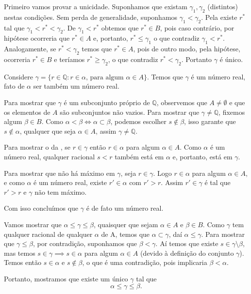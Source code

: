\documentclass[../main.tex]{subfiles}
\begin{document}
\begin{dem}
    Primeiro vamos provar a unicidade. Suponhamos que existam $\gamma_1, \gamma_2$ (distintos) nestas condições. Sem perda de generalidade, suponhamos $\gamma_1 < \gamma_2$.
    Pela  existe $r^*$ tal que $\gamma_1 < r^* < \gamma_2$. 
    De $\gamma_1 < r^*$ obtemos que $r^* \in B$, pois caso contrário, por hipótese ocorreria que $r^* \in A$ e, portanto, $r^* \leq \gamma_1$ o que contradiz $\gamma_1 < r^*$. Analogamente, se $r^* < \gamma_2$ temos que $r^* \in A$, pois de outro modo, pela hipótese, ocorreria $r^* \in B$ e teríamos $r^* \geq \gamma_2$, o que contradiz $ r^* < \gamma_2$. Portanto $\gamma$ é único.

    Considere $\gamma = \{ r \in \mathbb{Q} : r \in \alpha \text{, para algum } \alpha \in A \}$. Temos que $\gamma$ é um número real, fato de $\alpha$ ser também um número real.
    
    Para mostrar que $\gamma$ é um subconjunto próprio de $\mathbb{Q}$, observemos que $A \neq \emptyset$ e que os elementos de $A$ são subconjuntos não vazios. Para mostrar que $\gamma \neq \mathbb{Q}$, fixemos algum $\beta \in B$. Como $\alpha < \beta \iff \alpha \subset \beta$, podemos escolher $s \not\in \beta$, isso garante que $s \not\in \alpha$, qualquer que seja $\alpha \in A$, assim $\gamma \neq \mathbb{Q}$.

    Para mostrar o  da , se $r \in \gamma$ então $r \in \alpha$ para algum $\alpha \in A$. Como $\alpha$ é um número real, qualquer racional $s < r$ também está em $\alpha$ e, portanto, está em $\gamma$.

    Para mostrar que não há máximo em $\gamma$, seja $r \in \gamma$. Logo $r \in \alpha$ para algum $\alpha \in A$, e como $\alpha$ é um número real, existe $r' \in \alpha$ com $r'>r$. Assim $r' \in \gamma$ é tal que $r' > r$ e $\gamma$ não tem máximo. 

    Com isso concluímos que $\gamma$ é de fato um número real.

    Vamos mostrar que $\alpha \leq \gamma \leq \beta$, quaisquer que sejam $\alpha \in A$ e $\beta \in B$.
    Como $\gamma$ tem qualquer racional de qualquer $\alpha$ de A, temos que $\alpha \subset \gamma$, daí $\alpha \leq \gamma$.
    Para mostrar que $\gamma \leq \beta$, por contradição, suponhamos que $\beta < \gamma$. Aí temos que existe $s \in \gamma \setminus \beta$, mas temos $s \in \gamma \implies s \in \alpha$ para algum $\alpha \in A$ (devido à definição do conjunto $\gamma$). Temos então $s \in \alpha$ e $s \not\in \beta$, o que é uma contradição, pois implicaria $\beta < \alpha$.   

    Portanto, mostramos que existe um único $\gamma$ tal que 
    \[\alpha \leq \gamma \leq \beta.\]
\end{dem}
\end{document}
